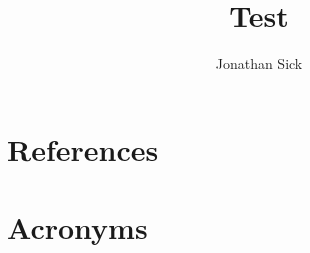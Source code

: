 \documentclass[DM,authoryear,toc]{lsstdoc}
\title{Test}
\author{%
Jonathan Sick
}
\date{\vcsDate}
\begin{document}
\mkshorttitle


\appendix
\section{References} \label{sec:bib}


\section{Acronyms} \label{sec:acronyms}

\end{document}
